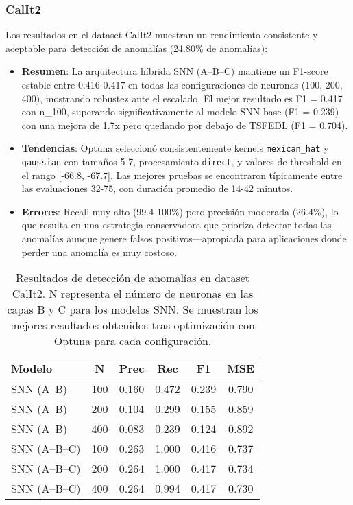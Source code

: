 \subsubsection{CalIt2}
Los resultados en el dataset CalIt2 muestran un rendimiento consistente y aceptable para detección de anomalías (24.80\% de anomalías):
\begin{itemize}
    \item \textbf{Resumen}: La arquitectura híbrida SNN (A--B--C) mantiene un F1-score estable entre 0.416-0.417 en todas las configuraciones de neuronas (100, 200, 400), mostrando robustez ante el escalado. El mejor resultado es F1 = 0.417 con n\_100, superando significativamente al modelo SNN base (F1 = 0.239) con una mejora de 1.7x pero quedando por debajo de TSFEDL (F1 = 0.704).
    \item \textbf{Tendencias}: Optuna seleccionó consistentemente kernels \texttt{mexican\_hat} y \texttt{gaussian} con tamaños 5-7, procesamiento \texttt{direct}, y valores de threshold en el rango [-66.8, -67.7]. Las mejores pruebas se encontraron típicamente entre las evaluaciones 32-75, con duración promedio de 14-42 minutos.
    \item \textbf{Errores}: Recall muy alto (99.4-100\%) pero precisión moderada (26.4\%), lo que resulta en una estrategia conservadora que prioriza detectar todas las anomalías aunque genere falsos positivos—apropiada para aplicaciones donde perder una anomalía es muy costoso.
\end{itemize}

\begin{table}[htbp]
\centering
\small
\begin{tabular}{lccccc}
\hline\hline
\textbf{Modelo} & \textbf{N} & \textbf{Prec} & \textbf{Rec} & \textbf{F1} & \textbf{MSE} \\
\hline
SNN (A--B) & 100 & 0.160 & 0.472 & 0.239 & 0.790 \\
SNN (A--B) & 200 & 0.104 & 0.299 & 0.155 & 0.859 \\
SNN (A--B) & 400 & 0.083 & 0.239 & 0.124 & 0.892 \\
\hline
SNN (A--B--C) & 100 & 0.263 & 1.000 & 0.416 & 0.737 \\
SNN (A--B--C) & 200 & 0.264 & 1.000 & 0.417 & 0.734 \\
SNN (A--B--C) & 400 & 0.264 & 0.994 & 0.417 & 0.730 \\
\hline\hline
\end{tabular}
\caption{Resultados de detección de anomalías en dataset CalIt2. N representa el número de neuronas en las capas B y C para los modelos SNN. Se muestran los mejores resultados obtenidos tras optimización con Optuna para cada configuración.}
\label{tab:resultados-iops-escalabilidad}
\end{table}


